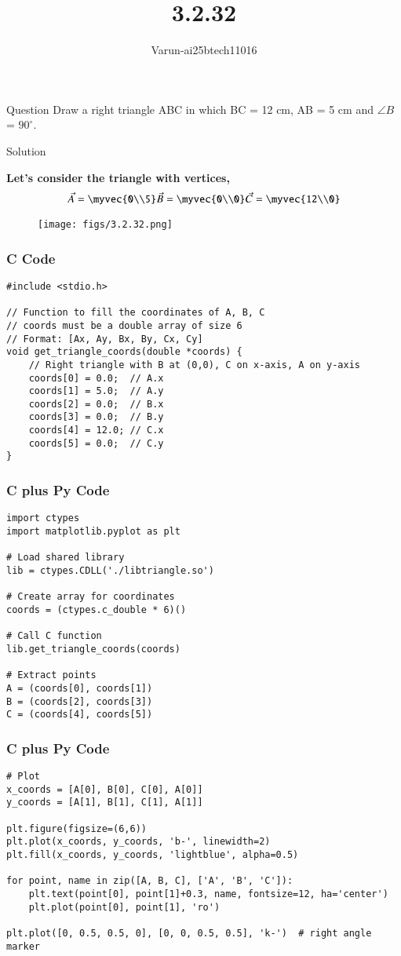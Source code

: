 \documentclass{beamer}
\title %
{3.2.32}
\author %
{Varun-ai25btech11016}
\begin{document}
\frame{\titlepage}
\begin{frame}{Question}
Draw a right triangle ABC in which BC = 12 cm, AB = 5 cm and $\angle B$ = $90^\circ$.
\end{frame}
\begin{frame}{Solution}

\textbf{Let's consider the triangle with vertices,}
\begin{align} 
\vec{A}=\myvec{0\\5}
\vec{B}=\myvec{0\\0}
\vec{C}=\myvec{12\\0}
\end{align}

\begin{figure}[h!]
    \centering
\texttt{[image: figs/3.2.32.png]}
    \caption{}
    \label{fig:1}
\end{figure}
\end{frame}
\begin{frame}[fragile]
    \frametitle{C Code}
\begin{lstlisting}
#include <stdio.h>

// Function to fill the coordinates of A, B, C
// coords must be a double array of size 6
// Format: [Ax, Ay, Bx, By, Cx, Cy]
void get_triangle_coords(double *coords) {
    // Right triangle with B at (0,0), C on x-axis, A on y-axis
    coords[0] = 0.0;  // A.x
    coords[1] = 5.0;  // A.y
    coords[2] = 0.0;  // B.x
    coords[3] = 0.0;  // B.y
    coords[4] = 12.0; // C.x
    coords[5] = 0.0;  // C.y
}
\end{lstlisting}
\end{frame}
\begin{frame}[fragile]
    \frametitle{C plus Py Code}
\begin{lstlisting}
import ctypes
import matplotlib.pyplot as plt

# Load shared library
lib = ctypes.CDLL('./libtriangle.so')

# Create array for coordinates
coords = (ctypes.c_double * 6)()

# Call C function
lib.get_triangle_coords(coords)

# Extract points
A = (coords[0], coords[1])
B = (coords[2], coords[3])
C = (coords[4], coords[5])
\end{lstlisting}
\end{frame}
\begin{frame}[fragile]
    \frametitle{C plus Py Code}
\begin{lstlisting}
# Plot
x_coords = [A[0], B[0], C[0], A[0]]
y_coords = [A[1], B[1], C[1], A[1]]

plt.figure(figsize=(6,6))
plt.plot(x_coords, y_coords, 'b-', linewidth=2)
plt.fill(x_coords, y_coords, 'lightblue', alpha=0.5)

for point, name in zip([A, B, C], ['A', 'B', 'C']):
    plt.text(point[0], point[1]+0.3, name, fontsize=12, ha='center')
    plt.plot(point[0], point[1], 'ro')

plt.plot([0, 0.5, 0.5, 0], [0, 0, 0.5, 0.5], 'k-')  # right angle marker
\end{lstlisting}
\end{frame}
\end{document}
